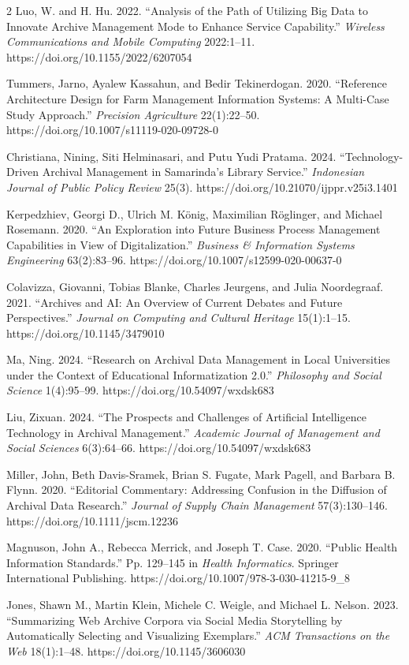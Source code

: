 \documentclass[12pt,a4paper]{article}
\begin{document}
\begin{multicols}{2}
Luo, W. and H. Hu. 2022. ``Analysis of the Path of Utilizing Big Data to Innovate Archive Management Mode to Enhance Service Capability.'' \emph{Wireless Communications and Mobile Computing} 2022:1--11. https://doi.org/10.1155/2022/6207054

Tummers, Jarno, Ayalew Kassahun, and Bedir Tekinerdogan. 2020. ``Reference Architecture Design for Farm Management Information Systems: A Multi-Case Study Approach.'' \emph{Precision Agriculture} 22(1):22--50. https://doi.org/10.1007/s11119-020-09728-0

Christiana, Nining, Siti Helminasari, and Putu Yudi Pratama. 2024. ``Technology-Driven Archival Management in Samarinda's Library Service.'' \emph{Indonesian Journal of Public Policy Review} 25(3). https://doi.org/10.21070/ijppr.v25i3.1401

Kerpedzhiev, Georgi D., Ulrich M. König, Maximilian Röglinger, and Michael Rosemann. 2020. ``An Exploration into Future Business Process Management Capabilities in View of Digitalization.'' \emph{Business \& Information Systems Engineering} 63(2):83--96. https://doi.org/10.1007/s12599-020-00637-0

Colavizza, Giovanni, Tobias Blanke, Charles Jeurgens, and Julia Noordegraaf. 2021. ``Archives and AI: An Overview of Current Debates and Future Perspectives.'' \emph{Journal on Computing and Cultural Heritage} 15(1):1--15. https://doi.org/10.1145/3479010

Ma, Ning. 2024. ``Research on Archival Data Management in Local Universities under the Context of Educational Informatization 2.0.'' \emph{Philosophy and Social Science} 1(4):95--99. https://doi.org/10.54097/wxdsk683

Liu, Zixuan. 2024. ``The Prospects and Challenges of Artificial Intelligence Technology in Archival Management.'' \emph{Academic Journal of Management and Social Sciences} 6(3):64--66. https://doi.org/10.54097/wxdsk683

Miller, John, Beth Davis-Sramek, Brian S. Fugate, Mark Pagell, and Barbara B. Flynn. 2020. ``Editorial Commentary: Addressing Confusion in the Diffusion of Archival Data Research.'' \emph{Journal of Supply Chain Management} 57(3):130--146. https://doi.org/10.1111/jscm.12236

Magnuson, John A., Rebecca Merrick, and Joseph T. Case. 2020. ``Public Health Information Standards.'' Pp. 129--145 in \emph{Health Informatics}. Springer International Publishing. https://doi.org/10.1007/978-3-030-41215-9\_8

Jones, Shawn M., Martin Klein, Michele C. Weigle, and Michael L. Nelson. 2023. ``Summarizing Web Archive Corpora via Social Media Storytelling by Automatically Selecting and Visualizing Exemplars.'' \emph{ACM Transactions on the Web} 18(1):1--48. https://doi.org/10.1145/3606030


\end{multicols}
\end{document}
